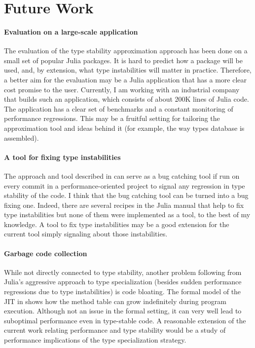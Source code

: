 \section{Future Work}

\paragraph{Evaluation on a large-scale application} The
evaluation of the type stability approximation approach has been done on a small
set of popular Julia packages. It is hard to predict how a package will be used,
and, by extension, what type instabilities will matter in practice. Therefore, a
better aim for the evaluation may be a Julia application that has a more clear
cost promise to the user. Currently, I am working with an industrial company
that builds such an application, which consists of about 200K lines of Julia
code. The application has a clear set of benchmarks and a constant monitoring of
performance regressions. This may be a fruitful setting for tailoring the
approximation tool and ideas behind it (for example, the way types database
is assembled).

\paragraph{A tool for fixing type instabilities} The approach and tool described in
 can serve as a bug catching tool if run on every
commit in a performance-oriented project to signal any regression in type
stability of the code. I think that the bug catching tool can be turned into a bug
fixing one. Indeed, there are several recipes in the Julia manual that help to
fix type instabilities but none of them were implemented as a tool, to the best
of my knowledge. A tool to fix type instabilities may be a good extension for
the current tool simply signaling about those instabilities.

\paragraph{Garbage code collection} While not directly connected to type
stability, another problem following from Julia's aggressive approach to type
specialization (besides sudden performance regressions due to type
instabilities) is code bloating. The formal model of the JIT in
 shows how the method table can grow indefinitely during
program execution. Although not an issue in the formal setting,  it can very
well lead to suboptimal performance even in type-stable code. A reasonable
extension of the current work relating performance and type stability would be a
study of performance implications of the type specialization strategy.
